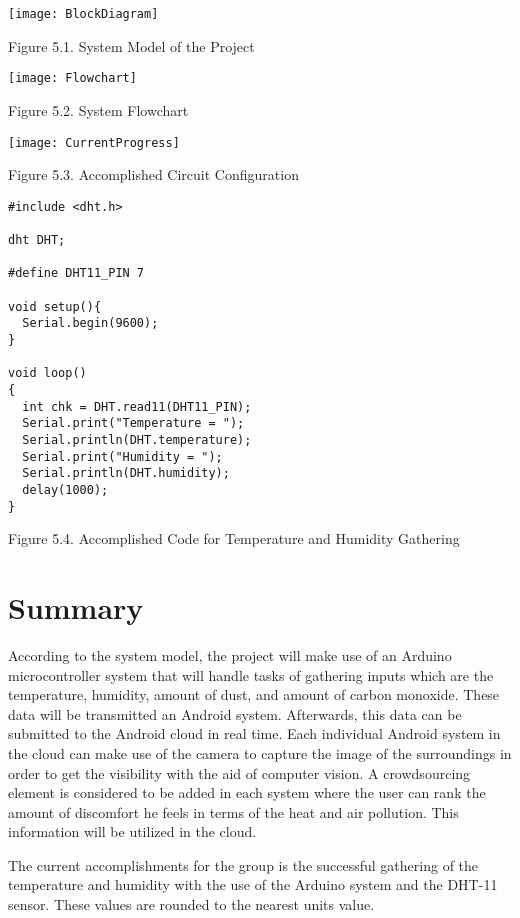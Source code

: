 \texttt{[image: BlockDiagram]}

\begin{center}
Figure 5.1. System Model of the Project
\end{center}

\begin{center}
\texttt{[image: Flowchart]}
\end{center}




\begin{center}
Figure 5.2. System Flowchart
\end{center}

\texttt{[image: CurrentProgress]}

\begin{center}
Figure 5.3. Accomplished Circuit Configuration
\end{center}







\begin{lstlisting}
#include <dht.h>

dht DHT;

#define DHT11_PIN 7

void setup(){
  Serial.begin(9600);
}

void loop()
{
  int chk = DHT.read11(DHT11_PIN);
  Serial.print("Temperature = ");
  Serial.println(DHT.temperature);
  Serial.print("Humidity = ");
  Serial.println(DHT.humidity);
  delay(1000);
}
\end{lstlisting}

\begin{center}
Figure 5.4. Accomplished Code for Temperature and Humidity Gathering
\end{center}

\section{Summary}

According to the system model, the project will make use of an Arduino microcontroller system that will handle tasks of gathering inputs which are the temperature, humidity, amount of dust, and amount of carbon monoxide. These data will be transmitted an Android system. Afterwards, this data can be submitted  to the Android cloud in real time. Each individual Android system in the cloud can make use of the camera to capture the image of the surroundings in order to get the visibility with the aid of computer vision. A crowdsourcing element is considered to be added in each system where the user can rank the amount of discomfort he feels in terms of the heat and air pollution. This information will be utilized in the cloud.

The current accomplishments for the group is the successful gathering of the temperature and humidity with the use of the Arduino system and the DHT-11 sensor. These values are rounded to the nearest units value.
